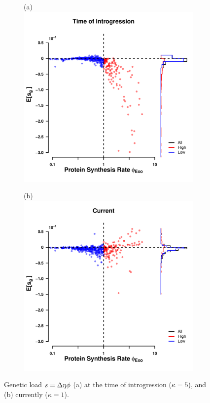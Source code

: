 \documentclass[fleqn,letterpaper]{article}
\begin{document}
\begin{figure}
    \centering
    \begin{subfigure}
        \centering
        (a) \includegraphics[width=.45\textwidth]{img/fitness_difference_gos_kappa5.pdf}
    \end{subfigure}
    \begin{subfigure}
        \centering
        (b) \includegraphics[width=.45\textwidth]{img/fitness_difference_exo.pdf}
    \end{subfigure}
    \caption{Genetic load $s = {\Delta \eta} \phi$ (a) at the time of introgression ($\kappa = 5$), and (b) currently ($\kappa = 1$). }
    \label{fig:sne_fitness_burden}
\end{figure}
\end{document}
